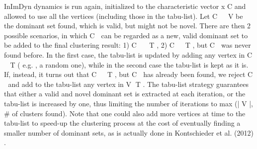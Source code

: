\documentclass[a4paper]{article}
\begin{document}
InImDyn dynamics is run again, initialized to the characteristic
vector x C and allowed to use all the vertices (including those in
the tabu-list). Let C
 ⊆ V be the dominant set found, which is
valid, but might not be novel. There are then 2 possible scenarios,
in which C
 can be regarded as a new, valid dominant set to be
added to the final clustering result: 1) C
 ⊆ T , 2) C
 ⊆ T , but C
 was
never found before. In the first case, the tabu-list is updated by
adding any vertex in C
 T ( e.g. , a random one), while in the second
case the tabu-list is kept as it is. If, instead, it turns out that C

⊆ T , but C
 has already been found, we reject C
 and add to the
tabu-list any vertex in V T . The tabu-list strategy guarantees that
either a valid and novel dominant set is extracted at each iteration,
or the tabu-list is increased by one, thus limiting the number of
iterations to max (| V |, # of clusters found). Note that one could also
add more vertices at time to the tabu-list to speed-up the clustering
process at the cost of eventually finding a smaller number of
dominant sets, as is actually done in Kontschieder et al. (2012) .
\end{document}
